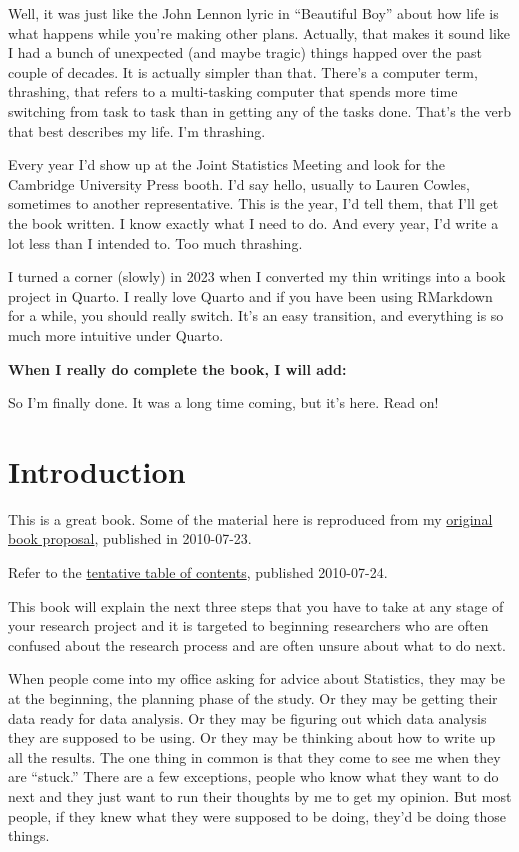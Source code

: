 \documentclass[
  letterpaper,
  DIV=11,
  numbers=noendperiod]{scrreprt}
\begin{document}
Well, it was just like the John Lennon lyric in ``Beautiful Boy'' about
how life is what happens while you're making other plans. Actually, that
makes it sound like I had a bunch of unexpected (and maybe tragic)
things happed over the past couple of decades. It is actually simpler
than that. There's a computer term, thrashing, that refers to a
multi-tasking computer that spends more time switching from task to task
than in getting any of the tasks done. That's the verb that best
describes my life. I'm thrashing.

Every year I'd show up at the Joint Statistics Meeting and look for the
Cambridge University Press booth. I'd say hello, usually to Lauren
Cowles, sometimes to another representative. This is the year, I'd tell
them, that I'll get the book written. I know exactly what I need to do.
And every year, I'd write a lot less than I intended to. Too much
thrashing.

I turned a corner (slowly) in 2023 when I converted my thin writings
into a book project in Quarto. I really love Quarto and if you have been
using RMarkdown for a while, you should really switch. It's an easy
transition, and everything is so much more intuitive under Quarto.

\textbf{When I really do complete the book, I will add:}

So I'm finally done. It was a long time coming, but it's here. Read on!


\chapter{Introduction}\label{introduction}

This is a great book. Some of the material here is reproduced from my
\href{http://www.pmean.com/10/SecondBook.html}{original book proposal},
published in 2010-07-23.

Refer to the \href{http://www.pmean.com/10/Contents.html}{tentative
table of contents}, published 2010-07-24.

This book will explain the next three steps that you have to take at any
stage of your research project and it is targeted to beginning
researchers who are often confused about the research process and are
often unsure about what to do next.

When people come into my office asking for advice about Statistics, they
may be at the beginning, the planning phase of the study. Or they may be
getting their data ready for data analysis. Or they may be figuring out
which data analysis they are supposed to be using. Or they may be
thinking about how to write up all the results. The one thing in common
is that they come to see me when they are ``stuck.'' There are a few
exceptions, people who know what they want to do next and they just want
to run their thoughts by me to get my opinion. But most people, if they
knew what they were supposed to be doing, they'd be doing those things.
\end{document}
